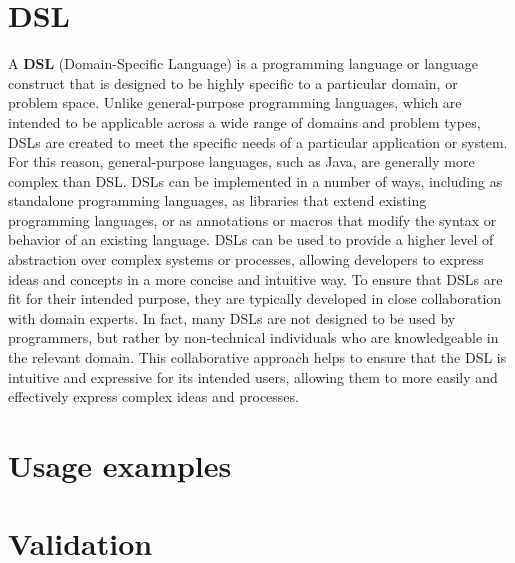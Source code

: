 \section{DSL}\label{section:dsl}
A \textbf{DSL} (Domain-Specific Language) \cite{dsl_definition} is a programming language or language construct that is designed to be highly specific to a particular domain, or problem space. Unlike general-purpose programming languages, which are intended to be applicable across a wide range of domains and problem types, DSLs are created to meet the specific needs of a particular application or system. For this reason, general-purpose languages, such as Java, are generally more complex than DSL.\newline 
DSLs can be implemented in a number of ways, including as standalone programming languages, as libraries that extend existing programming languages, or as annotations or macros that modify the syntax or behavior of an existing language. DSLs can be used to provide a higher level of abstraction over complex systems or processes, allowing developers to express ideas and concepts in a more concise and intuitive way.\newline
To ensure that DSLs are fit for their intended purpose, they are typically developed in close collaboration with domain experts. In fact, many DSLs are not designed to be used by programmers, but rather by non-technical individuals who are knowledgeable in the relevant domain. This collaborative approach helps to ensure that the DSL is intuitive and expressive for its intended users, allowing them to more easily and effectively express complex ideas and processes.

\section{Usage examples}\label{section:usage_example}

\section{Validation}\label{section:validation}
